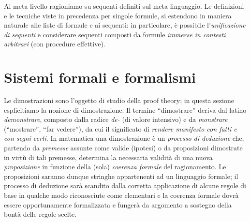 \documentclass[12pt,a4paper,openright,twoside]{report}
\begin{document}
Al meta-livello ragioniamo su sequenti definiti sul meta-linguaggio. Le definizioni e le tecniche viste in precedenza per singole formule, si estendono in maniera naturale alle liste di formule e ai sequenti: in particolare, \`e possibile l'\emph{unificazione di sequenti} e considerare sequenti composti da formule \emph{immerse in contesti arbitrari} (con procedure effettive).


\section{Sistemi formali e formalismi} 
Le dimostrazioni sono l'oggetto di studio della proof theory; in questa sezione esplicitiamo la nozione di dimostrazione. Il termine ``dimostrare'' deriva dal latino \emph{demonstrare}, composto dalla radice \emph{de-} (di valore intensivo) e da \emph{monstrare} (``mostrare'', ``far vedere''), da cui il significato di \emph{rendere manifesto con fatti e con segni certi}. In matematica una dimostrazione \`e un \emph{processo di deduzione} che, partendo da \emph{premesse} assunte come valide (ipotesi) o da proposizioni dimostrate in virt\`u di tali premesse, determina la necessaria validit\`a di una nuova \emph{proposizione} in funzione della (sola) \emph{coerenza formale} del ragionamento. Le proposizioni saranno dunque stringhe appartenenti ad un linguaggio formale; il processo di deduzione sar\`a scandito dalla corretta applicazione di alcune regole di base in qualche modo riconosciute come elementari e la coerenza formale dovr\`a essere opportunamente formalizzata e funger\`a da argomento a sostegno della bont\`a delle regole scelte.
\end{document}
